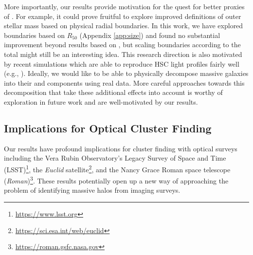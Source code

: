 \documentclass[fleqn,usenatbib,useAMS]{mnras}
\begin{document}
    More importantly, our results provide motivation for the quest for better proxies of \exsitu{}
    \mstar{}.
    For example, it could prove fruitful to explore improved definitions of outer stellar mass based
    on physical radial boundaries. 
    In this work, we have explored boundaries based on $R_{50}$ (Appendix \ref{app:size}) and found
    no substantial improvement beyond results based on , but scaling boundaries
    according to the total \mstar{} might still be an interesting idea.
    This research direction is also motivated by recent simulations which are able to reproduce HSC
    light profiles fairly well (e.g., \citealt{Ardila2021}). 
    Ideally, we would like to be able to physically decompose massive galaxies into their \insitu{}
    and \exsitu{} components using real data. More careful approaches towards this decomposition
    that take these additional effects into account is worthy of exploration in future work and are
    well-motivated by our results.
    
\subsection{Implications for Optical Cluster Finding}
    \label{sec:perfect_finder}
    
    Our results have profound implications for cluster finding with optical surveys including the
    Vera Rubin Observatory's Legacy Survey of Space and Time
    (LSST)\footnote{\url{https://www.lsst.org}}, the \textit{Euclid}
    satellite\footnote{\url{https://sci.esa.int/web/euclid}}, and the Nancy Grace Roman space
    telescope (\textit{Roman})\footnote{\url{https://roman.gsfc.nasa.gov}}.  
    These results potentially open up a new way of approaching the problem of identifying massive
    halos from imaging surveys.
\end{document}
